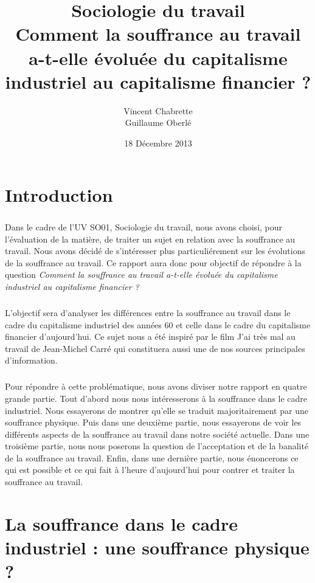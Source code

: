\documentclass{report}
\title{Sociologie du travail\\Comment la souffrance au travail a-t-elle évoluée du capitalisme industriel au capitalisme financier ?}
\author{Vincent Chabrette\\Guillaume Oberlé}
\date{18 Décembre 2013}
\begin{document}

\maketitle
\tableofcontents

\chapter*{Introduction}
	\paragraph{}
		Dans le cadre de l'UV SO01, Sociologie du travail, nous avons choisi, pour l'évaluation de la matière, de traiter un sujet en relation avec la souffrance au travail. Nous avons décidé de s'intéresser plus particuliérement sur les évolutions de la souffrance au travail. Ce rapport aura donc pour objectif de répondre à la question \textit{Comment la souffrance au travail a-t-elle évoluée du capitalisme industriel au capitalisme financier ?}

	\paragraph{}
		L’objectif sera d’analyser les différences entre la souffrance au travail dans le cadre du capitalisme industriel des années 60 et celle dans le cadre du capitalisme financier d’aujourd’hui. Ce sujet nous a été inspiré par le film J’ai très mal au travail de Jean-Michel Carré qui constituera aussi une de nos sources principales d’information.

	\paragraph{}
		Pour répondre à cette problématique, nous avons diviser notre rapport en quatre grande partie. Tout d'abord nous nous intéresserons à la souffrance dans le cadre industriel. Nous essayerons de montrer qu'elle se traduit majoritairement par une souffrance physique. Puis dans une deuxième partie, nous essayerons de voir les différents aspects de la souffrance au travail dans notre société actuelle. Dans une troisième partie, nous nous poserons la question de l'acceptation et de la banalité de la souffrance au travail. Enfin, dans une dernière partie, nous énoncerons ce qui est possible et ce qui fait à l'heure d'aujourd'hui pour contrer et traiter la souffrance au travail.

\chapter{La souffrance dans le cadre industriel : une souffrance physique ?}
\end{document}
